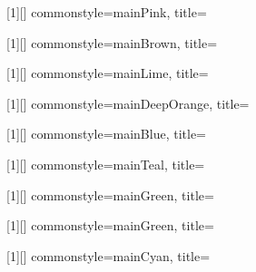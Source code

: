 [1][]{
	commonstyle=mainPink,
	title={}
}

[1][]{
	commonstyle=mainBrown,
	title={}
}

[1][]{
	commonstyle=mainLime,
	title={}
}

[1][]{
	commonstyle=mainDeepOrange,
	title={}
}

[1][]{
	commonstyle=mainBlue,
	title={}
}

[1][]{
	commonstyle=mainTeal,
	title={}
}

[1][]{
	commonstyle=mainGreen,
	title={}
}

[1][]{
	commonstyle=mainGreen,
	title={}
}

[1][]{
	commonstyle=mainCyan,
	title={}
}


\newcommand{\trous}[1]{\makebox[#1]{\rule{0pt}{1.2ex}\dotfill}}

\newcommand{\divfrac}[2]{\left.\raisebox{.2ex}{$#1$}\middle/\raisebox{-.2ex}{$#2$}\right.}

\newcommand{\vect}[1]{\overrightarrow{#1}}
\newcommand{\norme}[1]{\left\lVert #1 \right\rVert}
\newcommand{\abs}[1]{\left| #1 \right|}
\newcommand{\coord}[2]{\begin{pmatrix} #1 \\ #2 \end{pmatrix}}

\newcommand{\arc}[1]{\widehat{#1}}
\newcommand{\angw}[1]{\widehat{#1}}

